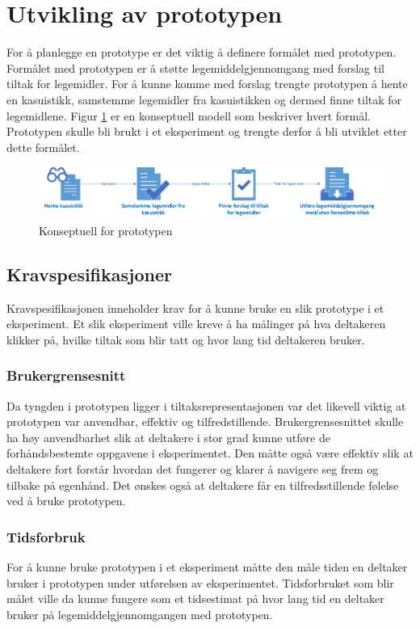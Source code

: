 \section{Utvikling av prototypen}
 For å planlegge en prototype er det viktig å definere formålet med prototypen. Formålet med prototypen er å støtte legemiddelgjennomgang med forslag til tiltak for legemidler. For å kunne komme med forslag trengte prototypen å hente en kasuistikk, samstemme legemidler fra kasuistikken og dermed finne tiltak for legemidlene. Figur \ref{fig:formaalsbildeProto} er en konseptuell modell som beskriver hvert formål. Prototypen skulle bli brukt i et eksperiment og trengte derfor å bli utviklet etter dette formålet.
\begin{figure}[H]
\begin{center}
\includegraphics[width=14cm]{images/Formaalsbilde_prototype.png}
\caption{Konseptuell for prototypen}
\label{fig:formaalsbildeProto}
\end{center}
\end{figure}
\subsection{Kravspesifikasjoner}
Kravspesifikasjonen inneholder krav for å kunne bruke en slik prototype i et eksperiment. Et slik eksperiment ville kreve å ha målinger på hva deltakeren klikker på, hvilke tiltak som blir tatt og hvor lang tid deltakeren bruker.
\subsubsection{Brukergrensesnitt}
Da tyngden i prototypen ligger i tiltaksrepresentasjonen var det likevell viktig at prototypen var anvendbar, effektiv og tilfredstillende. Brukergrensesnittet skulle ha høy anvendbarhet slik at deltakere i stor grad kunne utføre de forhåndsbestemte oppgavene i eksperimentet. Den måtte også være effektiv slik at deltakere fort forstår hvordan det fungerer og klarer å navigere seg frem og tilbake på egenhånd. Det ønskes også at deltakere får en tilfredsstillende følelse ved å bruke prototypen.
\subsubsection{Tidsforbruk}
For å kunne bruke prototypen i et eksperiment måtte den måle tiden en deltaker bruker i prototypen under utførelsen av eksperimentet. Tidsforbruket som blir målet ville da kunne fungere som et tidsestimat på hvor lang tid en deltaker bruker på legemiddelgjennomgangen med prototypen.
